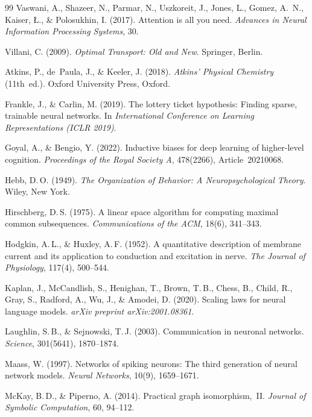 \documentclass[12pt, a4paper, openany]{report}
\begin{document}
\begin{thebibliography}{99}
Vaswani, A., Shazeer, N., Parmar, N., Uszkoreit, J., Jones, L., Gomez, A.~N.,
Kaiser, \L., \& Polosukhin, I. (2017).
Attention is all you need.
\textit{Advances in Neural Information Processing Systems}, 30.

Villani, C. (2009).
\textit{Optimal Transport: Old and New}.
Springer, Berlin.


Atkins, P., de~Paula, J., \& Keeler, J. (2018).
\textit{Atkins' Physical Chemistry} (11th~ed.).
Oxford University Press, Oxford.

Frankle, J., \& Carlin, M. (2019).
The lottery ticket hypothesis: Finding sparse, trainable neural networks.
In \textit{International Conference on Learning Representations (ICLR 2019)}.

Goyal, A., \& Bengio, Y. (2022).
Inductive biases for deep learning of higher-level cognition.
\textit{Proceedings of the Royal Society A}, 478(2266), Article~20210068.

Hebb, D.\,O. (1949).
\textit{The Organization of Behavior: A Neuropsychological Theory}.
Wiley, New York.

Hirschberg, D.\,S. (1975).
A linear space algorithm for computing maximal common subsequences.
\textit{Communications of the ACM}, 18(6), 341--343.

Hodgkin, A.\,L., \& Huxley, A.\,F. (1952).
A quantitative description of membrane current and its application to
conduction and excitation in nerve.
\textit{The Journal of Physiology}, 117(4), 500--544.

Kaplan, J., McCandlish, S., Henighan, T., Brown, T.\,B., Chess, B.,
Child, R., Gray, S., Radford, A., Wu, J., \& Amodei, D. (2020).
Scaling laws for neural language models.
\textit{arXiv preprint arXiv:2001.08361}.

Laughlin, S.\,B., \& Sejnowski, T.\,J. (2003).
Communication in neuronal networks.
\textit{Science}, 301(5641), 1870--1874.

Maass, W. (1997).
Networks of spiking neurons: The third generation of neural network models.
\textit{Neural Networks}, 10(9), 1659--1671.

McKay, B.\,D., \& Piperno, A. (2014).
Practical graph isomorphism,~{II}.
\textit{Journal of Symbolic Computation}, 60, 94--112.


\end{thebibliography}
\end{document}
